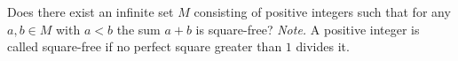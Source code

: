 Does there exist an infinite set $\displaystyle{M}$ consisting of positive integers such that for any  $\displaystyle{a,b \in M}$ with $\displaystyle{a < b}$ the sum $\displaystyle{a + b}$ is square-free?
\textit{Note.} A positive integer is called  square-free if no perfect square greater than  $\displaystyle{1}$ divides it.

